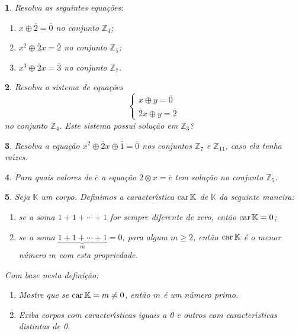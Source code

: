 \documentclass[12pt]{exam}
\newtheorem{exercicio}{}
\newcommand{\integer}{\mathbb{Z}}
\newcommand{\ch}{\mbox{\textrm{car\,}}\nobreak}
\begin{document}
\begin{exercicio}
Resolva as seguintes equa\c{c}\~oes:
\begin{enumerate}[label={\alph*})]
  \item $x \oplus \overline{2} = \overline{0}$ no conjunto $\integer_4$;
  \item $x^2 \oplus \overline{2}x = \overline{2}$ no conjunto $\integer_5$;
  \item $x^3 \oplus \overline{2}x = \overline{3}$ no conjunto $\integer_7$.
\end{enumerate}
\end{exercicio}

\begin{exercicio}
  Resolva o sistema de equa\c{c}\~oes
  \[
    \begin{cases}
      x \oplus y = \overline{0}\\
      \overline{2}x \oplus y = \overline{2}
    \end{cases}
  \]
  no conjunto $\integer_4$. Este sistema possui solu\c{c}\~ao em $\integer_3$?
\end{exercicio}

\begin{exercicio}
  Resolva a equa\c{c}\~ao $x^2 \oplus \overline{2}x \oplus \overline{1} = \overline{0}$ nos conjuntos $\integer_7$ e $\integer_{11}$, caso ela tenha ra{\'\i}zes.
\end{exercicio}

\begin{exercicio}
  Para quais valores de $\overline{c}$ a equa\c{c}\~ao $\overline{2}\otimes x = \overline{c}$ tem solu\c{c}\~ao no conjunto $\integer_5$.
\end{exercicio}

\begin{exercicio}
Seja $\mathbb{K}$ um corpo. Definimos a caracter{\'\i}stica \textbf{$\ch \mathbb{K}$} de $\mathbb{K}$ da seguinte maneira:
\begin{enumerate}[label=({\roman*})]
  \item se a soma $1 + 1 + \cdots + 1$ for sempre diferente de zero, ent\~ao \textbf{$\ch \mathbb{K} = 0$};
  \item se a soma $\underbrace{1 + 1 + \cdots + 1}_{m} = 0$, para algum $m \ge 2$, ent\~ao \textbf{$\ch \mathbb{K}$} \'e o menor n\'umero $m$ com esta propriedade.
\end{enumerate}
Com base nesta defini\c{c}\~ao:
\begin{enumerate}[label={\alph*})]
  \item Mostre que se $\ch \mathbb{K} = m \ne 0$, ent\~ao $m$ \'e um n\'umero primo.
  \item Exiba corpos com caracter{\'\i}sticas iguais a 0 e outros com caracter{\'\i}sticas distintas de 0.
\end{enumerate}
\end{exercicio}
\end{document}

